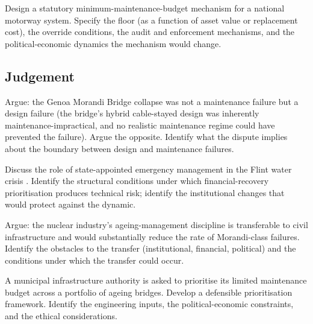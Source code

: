 \begin{exercise}
Design a statutory minimum-maintenance-budget mechanism for a national motorway system. Specify the floor (as a function of asset value or replacement cost), the override conditions, the audit and enforcement mechanisms, and the political-economic dynamics the mechanism would change.
\end{exercise}

\subsection*{Judgement}

\begin{exercise}
Argue: the Genoa Morandi Bridge collapse \cite{acc:mit-morandi-2018} was not a maintenance failure but a design failure (the bridge's hybrid cable-stayed design was inherently maintenance-impractical, and no realistic maintenance regime could have prevented the failure). Argue the opposite. Identify what the dispute implies about the boundary between design and maintenance failures.
\end{exercise}

\begin{exercise}
Discuss the role of state-appointed emergency management in the Flint water crisis \cite{acc:fwatf-2016}. Identify the structural conditions under which financial-recovery prioritisation produces technical risk; identify the institutional changes that would protect against the dynamic.
\end{exercise}

\begin{exercise}
Argue: the nuclear industry's ageing-management discipline is transferable to civil infrastructure and would substantially reduce the rate of Morandi-class failures. Identify the obstacles to the transfer (institutional, financial, political) and the conditions under which the transfer could occur.
\end{exercise}

\begin{exercise}
A municipal infrastructure authority is asked to prioritise its limited maintenance budget across a portfolio of ageing bridges. Develop a defensible prioritisation framework. Identify the engineering inputs, the political-economic constraints, and the ethical considerations.
\end{exercise}
